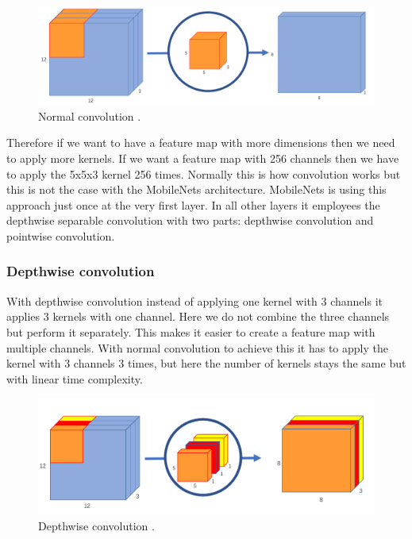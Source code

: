 \begin{figure}[!htb]
    \centering
    \includegraphics[width=1\textwidth]{figures/normalconvolution2.png}
    \caption{Normal convolution \cite{normalconvolution}.}
    \label{fig:normconv}
\end{figure}

Therefore if we want to have a feature map with more dimensions then we need to apply more kernels. If we want a feature map with 256 channels then we have to apply the 5x5x3 kernel 256 times. Normally this is how convolution works but this is not the case with the MobileNets architecture. MobileNets is using this approach just once at the very first layer. In all other layers it employees the depthwise separable convolution with two parts: depthwise convolution and pointwise convolution. 



\subsubsection{Depthwise convolution}
 

With depthwise convolution instead of applying one kernel with 3 channels it applies 3 kernels with one channel. Here we do not combine the three channels but perform it separately. This makes it easier to create a feature map with multiple channels. With normal convolution to achieve this it has to apply the kernel with 3 channels 3 times, but here the number of kernels stays the same but with linear time complexity. 




\begin{figure}[!htb]
    \centering
    \includegraphics[width=1\textwidth]{figures/depthwise2.png}
    \caption{Depthwise convolution \cite{normalconvolution}.}
    \label{fig:depthconv}
\end{figure}

